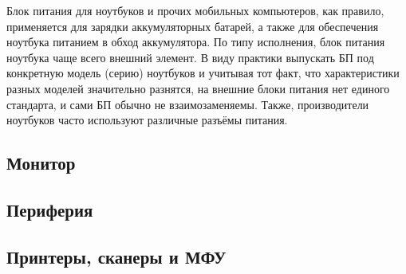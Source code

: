 Блок питания для ноутбуков и прочих мобильных компьютеров, как правило, применяется для зарядки аккумуляторных батарей, а также для обеспечения ноутбука питанием в обход аккумулятора.
По типу исполнения, блок питания ноутбука чаще всего внешний элемент.
В виду практики выпускать БП под конкретную модель (серию) ноутбуков и учитывая тот факт, что характеристики разных моделей значительно разнятся, на внешние блоки питания нет единого стандарта, и сами БП обычно не взаимозаменяемы.
Также, производители ноутбуков часто используют различные разъёмы питания.

\subsection{Монитор}\label{base:introduction:components:monitor}


\subsection{Периферия}\label{base:introduction:components:peripheral}


\subsection{Принтеры, сканеры и МФУ}\label{base:introduction:components:printers}

